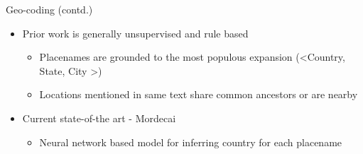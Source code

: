 \begin{frame}{Geo-coding (contd.)}
\begin{itemize}
    \item Prior work is generally unsupervised and rule based
    \begin{itemize}
        \item Placenames are grounded to the most populous expansion (\textless Country, State, City \textgreater)
        \item Locations mentioned in same text share common ancestors or are nearby
    \end{itemize}
    \item Current state-of-the art - Mordecai~\cite{halterman2017mordecai}
    \begin{itemize}
        \item Neural network based model for inferring country for each placename
    \end{itemize}
\end{itemize}
\end{frame}

